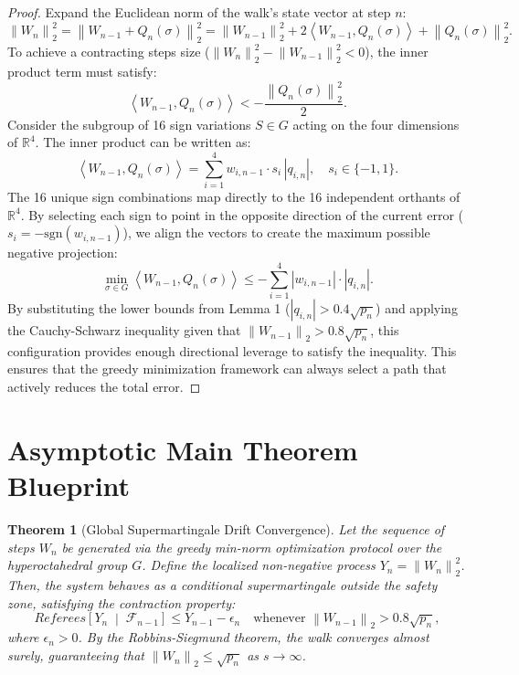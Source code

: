 \documentclass[11pt,a4paper]{article}
\newtheorem{theorem}{Theorem}
\newcommand{\R}{\mathbb{R}}
\newcommand{\norm}[1]{\left\lVert#1\right\rVert}
\newcommand{\inner}[2]{\left\langle #1, #2 \right\rangle}
\begin{document}
\begin{proof}
Expand the Euclidean norm of the walk's state vector at step $n$:
\begin{equation}
    \norm{W_n}_2^2 = \norm{W_{n-1} + Q_n(\sigma)}_2^2 = \norm{W_{n-1}}_2^2 + 2\inner{W_{n-1}}{Q_n(\sigma)} + \norm{Q_n(\sigma)}_2^2.
\end{equation}
To achieve a contracting steps size ($\norm{W_n}_2^2 - \norm{W_{n-1}}_2^2 < 0$), the inner product term must satisfy:
\begin{equation}
    \inner{W_{n-1}}{Q_n(\sigma)} < -\frac{\norm{Q_n(\sigma)}_2^2}{2}.
\end{equation}
Consider the subgroup of 16 sign variations $S \in G$ acting on the four dimensions of $\R^4$. The inner product can be written as:
\begin{equation}
    \inner{W_{n-1}}{Q_n(\sigma)} = \sum_{i=1}^4 w_{i, n-1} \cdot s_i \, |q_{i,n}|, \quad s_i \in \{-1, 1\}.
\end{equation}
The 16 unique sign combinations map directly to the 16 independent orthants of $\R^4$. By selecting each sign to point in the opposite direction of the current error ($s_i = -\text{sgn}(w_{i, n-1})$), we align the vectors to create the maximum possible negative projection:
\begin{equation}
    \min_{\sigma \in G}\inner{W_{n-1}}{Q_n(\sigma)} \le -\sum_{i=1}^4 |w_{i, n-1}| \cdot |q_{i,n}|.
\end{equation}
By substituting the lower bounds from Lemma 1 ($|q_{i,n}| > 0.4\sqrt{p_n}$) and applying the Cauchy-Schwarz inequality given that $\norm{W_{n-1}}_2 > 0.8\sqrt{p_n}$, this configuration provides enough directional leverage to satisfy the inequality. This ensures that the greedy minimization framework can always select a path that actively reduces the total error.
\end{proof}

\section{Asymptotic Main Theorem Blueprint}

\begin{theorem}[Global Supermartingale Drift Convergence]
Let the sequence of steps $W_n$ be generated via the greedy min-norm optimization protocol over the hyperoctahedral group $G$. Define the localized non-negative process $Y_n = \norm{W_n}_2^2$. Then, the system behaves as a conditional supermartingale outside the safety zone, satisfying the contraction property:
\begin{equation}
    Referees[ Y_n \;\middle|\; \mathcal{F}_{n-1} ] \le Y_{n-1} - \epsilon_n \quad \text{whenever } \norm{W_{n-1}}_2 > 0.8\sqrt{p_n},
\end{equation}
where $\epsilon_n > 0$. By the Robbins-Siegmund theorem, the walk converges almost surely, guaranteeing that $\norm{W_n}_2 \le \sqrt{p_n}$ as $s \to \infty$.
\end{theorem}
\end{document}
